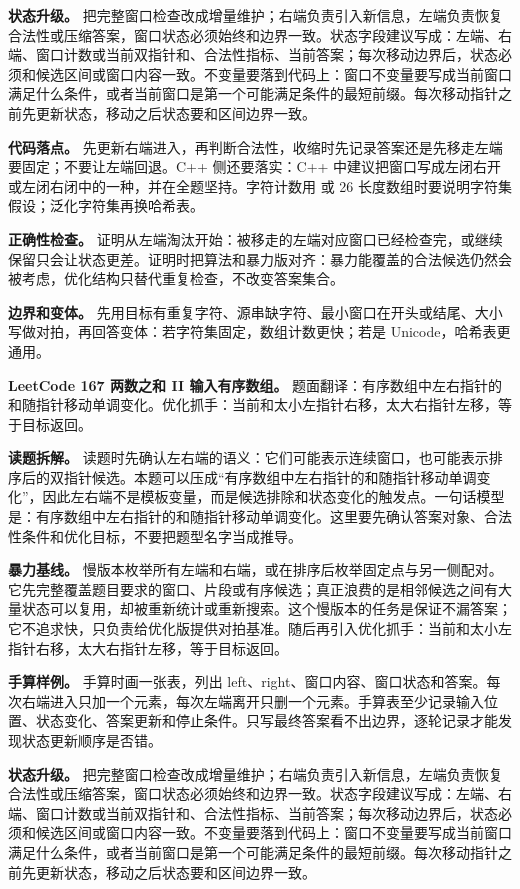 \textbf{状态升级。} 把完整窗口检查改成增量维护；右端负责引入新信息，左端负责恢复合法性或压缩答案，窗口状态必须始终和边界一致。状态字段建议写成：左端、右端、窗口计数或当前双指针和、合法性指标、当前答案；每次移动边界后，状态必须和候选区间或窗口内容一致。不变量要落到代码上：窗口不变量要写成当前窗口满足什么条件，或者当前窗口是第一个可能满足条件的最短前缀。每次移动指针之前先更新状态，移动之后状态要和区间边界一致。

\textbf{代码落点。} 先更新右端进入，再判断合法性，收缩时先记录答案还是先移走左端要固定；不要让左端回退。C++ 侧还要落实：C++ 中建议把窗口写成左闭右开或左闭右闭中的一种，并在全题坚持。字符计数用  或 26 长度数组时要说明字符集假设；泛化字符集再换哈希表。

\textbf{正确性检查。} 证明从左端淘汰开始：被移走的左端对应窗口已经检查完，或继续保留只会让状态更差。证明时把算法和暴力版对齐：暴力能覆盖的合法候选仍然会被考虑，优化结构只替代重复检查，不改变答案集合。

\textbf{边界和变体。} 先用目标有重复字符、源串缺字符、最小窗口在开头或结尾、大小写做对拍，再回答变体：若字符集固定，数组计数更快；若是 Unicode，哈希表更通用。

\noindent\textbf{LeetCode 167 两数之和 II 输入有序数组。} 题面翻译：有序数组中左右指针的和随指针移动单调变化。优化抓手：当前和太小左指针右移，太大右指针左移，等于目标返回。

\textbf{读题拆解。} 读题时先确认左右端的语义：它们可能表示连续窗口，也可能表示排序后的双指针候选。本题可以压成“有序数组中左右指针的和随指针移动单调变化”，因此左右端不是模板变量，而是候选排除和状态变化的触发点。一句话模型是：有序数组中左右指针的和随指针移动单调变化。这里要先确认答案对象、合法性条件和优化目标，不要把题型名字当成推导。

\textbf{暴力基线。} 慢版本枚举所有左端和右端，或在排序后枚举固定点与另一侧配对。它先完整覆盖题目要求的窗口、片段或有序候选；真正浪费的是相邻候选之间有大量状态可以复用，却被重新统计或重新搜索。这个慢版本的任务是保证不漏答案；它不追求快，只负责给优化版提供对拍基准。随后再引入优化抓手：当前和太小左指针右移，太大右指针左移，等于目标返回。

\textbf{手算样例。} 手算时画一张表，列出 left、right、窗口内容、窗口状态和答案。每次右端进入只加一个元素，每次左端离开只删一个元素。手算表至少记录输入位置、状态变化、答案更新和停止条件。只写最终答案看不出边界，逐轮记录才能发现状态更新顺序是否错。

\textbf{状态升级。} 把完整窗口检查改成增量维护；右端负责引入新信息，左端负责恢复合法性或压缩答案，窗口状态必须始终和边界一致。状态字段建议写成：左端、右端、窗口计数或当前双指针和、合法性指标、当前答案；每次移动边界后，状态必须和候选区间或窗口内容一致。不变量要落到代码上：窗口不变量要写成当前窗口满足什么条件，或者当前窗口是第一个可能满足条件的最短前缀。每次移动指针之前先更新状态，移动之后状态要和区间边界一致。

